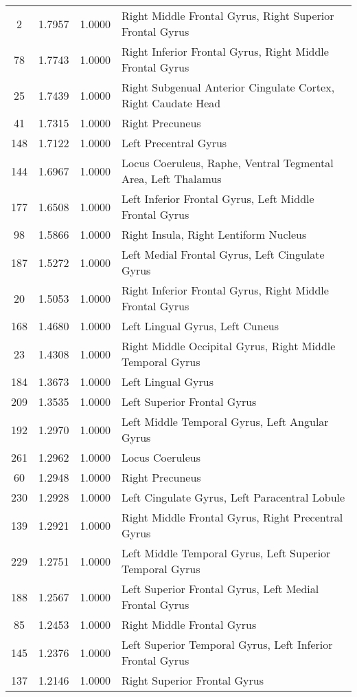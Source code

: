 \documentclass[10pt,letterpaper]{article}\usepackage[]{graphicx}\usepackage[]{color}
\begin{document}
\begin{center}
\begin{longtable}[c]{cccp{4in}}
		2	& 1.7957 & 1.0000 & Right Middle Frontal Gyrus, Right Superior Frontal Gyrus \\
		78	& 1.7743 & 1.0000 & Right Inferior Frontal Gyrus, Right Middle Frontal Gyrus \\
		25	& 1.7439 & 1.0000 & Right Subgenual Anterior Cingulate Cortex, Right Caudate Head \\
		41	& 1.7315 & 1.0000 & Right Precuneus \\
		148	& 1.7122 & 1.0000 & Left Precentral Gyrus \\
		144	& 1.6967 & 1.0000 & Locus Coeruleus, Raphe, Ventral Tegmental Area, Left Thalamus \\
		177	& 1.6508 & 1.0000 & Left Inferior Frontal Gyrus, Left Middle Frontal Gyrus \\
		98	& 1.5866 & 1.0000 & Right Insula, Right Lentiform Nucleus \\
		187	& 1.5272 & 1.0000 & Left Medial Frontal Gyrus, Left Cingulate Gyrus \\
		20	& 1.5053 & 1.0000 & Right Inferior Frontal Gyrus, Right Middle Frontal Gyrus \\
		168	& 1.4680 & 1.0000 & Left Lingual Gyrus, Left Cuneus \\
		23	& 1.4308 & 1.0000 & Right Middle Occipital Gyrus, Right Middle Temporal Gyrus \\
		184	& 1.3673 & 1.0000 & Left Lingual Gyrus \\
		209	& 1.3535 & 1.0000 & Left Superior Frontal Gyrus \\
		192	& 1.2970 & 1.0000 & Left Middle Temporal Gyrus, Left Angular Gyrus \\
		261	& 1.2962 & 1.0000 & Locus Coeruleus \\
		60	& 1.2948 & 1.0000 & Right Precuneus \\
		230	& 1.2928 & 1.0000 & Left Cingulate Gyrus, Left Paracentral Lobule \\
		139	& 1.2921 & 1.0000 & Right Middle Frontal Gyrus, Right Precentral Gyrus \\
		229	& 1.2751 & 1.0000 & Left Middle Temporal Gyrus, Left Superior Temporal Gyrus \\
		188	& 1.2567 & 1.0000 & Left Superior Frontal Gyrus, Left Medial Frontal Gyrus \\
		85	& 1.2453 & 1.0000 & Right Middle Frontal Gyrus \\
		145	& 1.2376 & 1.0000 & Left Superior Temporal Gyrus, Left Inferior Frontal Gyrus \\
		137	& 1.2146 & 1.0000 & Right Superior Frontal Gyrus \\

\end{longtable}
\end{center}
\end{document}
